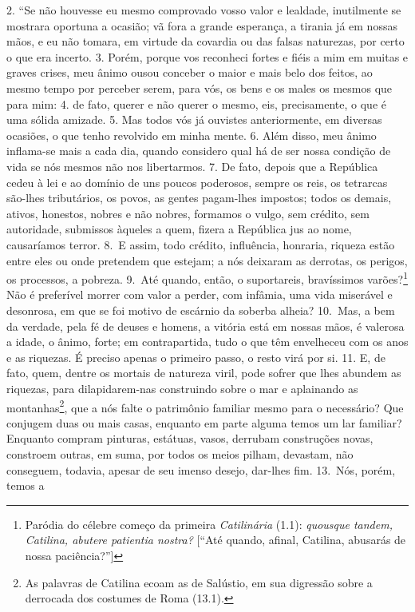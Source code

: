 2. “Se não houvesse eu mesmo comprovado vosso valor e lealdade, inutilmente se
mostrara oportuna a ocasião; vã fora a grande esperança, a tirania já em nossas
mãos, e eu não tomara, em virtude da covardia ou das falsas naturezas, por
certo o que era incerto. 3. Porém, porque vos reconheci fortes e fiéis a mim em
muitas e graves crises, meu ânimo ousou conceber o maior e mais belo dos
feitos, ao mesmo tempo por perceber serem, para vós, os bens e os males os
mesmos que para mim: 4. de fato, querer e não querer o mesmo, eis,
precisamente, o que é uma sólida amizade. 5. Mas todos vós já ouvistes
anteriormente, em diversas ocasiões, o que tenho revolvido em minha mente. 6.
Além disso, meu ânimo inflama-se mais a cada dia, quando considero qual há de
ser nossa condição de vida se nós mesmos não nos libertarmos. 7. De fato,
depois que a República cedeu à lei e ao domínio de uns poucos poderosos, sempre
os reis, os tetrarcas são-lhes tributários, os povos, as gentes pagam-lhes
impostos; todos os demais, ativos, honestos, nobres e não nobres, formamos o
vulgo, sem crédito, sem autoridade, submissos àqueles a quem, fizera a
República jus ao nome, causaríamos terror. 8.~E assim, todo crédito,
influência, honraria, riqueza estão entre eles ou onde pretendem que estejam; a
nós deixaram as derrotas, os perigos, os processos, a pobreza. 9.~Até quando,
então, o suportareis, bravíssimos varões?\footnote{Paródia do célebre começo da
primeira \emph{Catilinária} (1.1): \emph{quousque tandem, Catilina, abutere
patientia nostra?} [``Até quando, afinal, Catilina, abusarás de nossa
paciência?'']} Não é preferível morrer com valor a perder, com infâmia, uma
vida miserável e desonrosa, em que se foi motivo de escárnio da soberba alheia?
10.~Mas, a bem da verdade, pela fé de deuses e homens, a vitória está em nossas
mãos, é valerosa a idade, o ânimo, forte; em contrapartida, tudo o que têm
envelheceu com os anos e as riquezas. É preciso apenas o primeiro passo, o
resto virá por si. 11. E, de fato, quem, dentre os mortais de natureza viril,
pode sofrer que lhes abundem as riquezas, para dilapidarem-nas construindo
sobre o mar e aplainando as montanhas\footnote{As palavras de Catilina ecoam as
de Salústio, em sua digressão sobre a derrocada dos costumes de Roma (13.1).}, que a nós falte o patrimônio familiar mesmo para o necessário? Que
conjugem duas ou mais casas, enquanto em parte alguma temos um lar familiar?
Enquanto compram pinturas, estátuas, vasos, derrubam construções novas,
constroem outras, em suma, por todos os meios pilham, devastam, não conseguem,
todavia, apesar de seu imenso desejo, dar-lhes fim. 13.~Nós, porém, temos a
